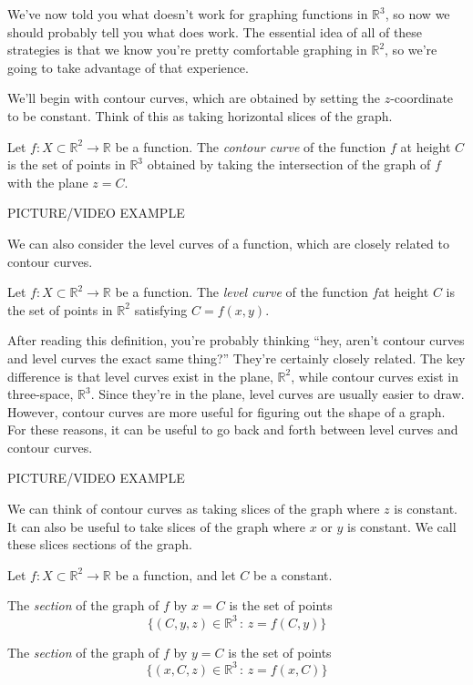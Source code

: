 \documentclass{ximera}
\begin{document}
We've now told you what doesn't work for graphing functions in $\mathbb{R}^3$, so now we should probably tell you what does work. The essential idea of all of these strategies is that we know you're pretty comfortable graphing in $\mathbb{R}^2$, so we're going to take advantage of that experience.

We'll begin with contour curves, which are obtained by setting the $z$-coordinate to be constant. Think of this as taking horizontal slices of the graph.

\begin{definition}
Let $f:X\subset\mathbb{R}^2\rightarrow\mathbb{R}$ be a function. The \emph{contour curve} of the function $f$ at height $C$ is the set of points in $\mathbb{R}^3$ obtained by taking the intersection of the graph of $f$ with the plane $z=C$.
\end{definition} 

PICTURE/VIDEO EXAMPLE

We can also consider the level curves of a function, which are closely related to contour curves.

\begin{definition}
Let $f:X\subset\mathbb{R}^2\rightarrow\mathbb{R}$ be a function. The \emph{level curve} of the function $f$at height $C$ is the set of points in $\mathbb{R}^2$ satisfying $C = f(x,y)$.
\end{definition}

After reading this definition, you're probably thinking ``hey, aren't contour curves and level curves the exact same thing?'' They're certainly closely related. The key difference is that level curves exist in the plane, $\mathbb{R}^2$, while contour curves exist in three-space, $\mathbb{R}^3$. Since they're in the plane, level curves are usually easier to draw. However, contour curves are more useful for figuring out the shape of a graph. For these reasons, it can be useful to go back and forth between level curves and contour curves.

PICTURE/VIDEO EXAMPLE

We can think of contour curves as taking slices of the graph where $z$ is constant. It can also be useful to take slices of the graph where $x$ or $y$ is constant. We call these slices sections of the graph.

\begin{definition}
Let $f:X\subset\mathbb{R}^2\rightarrow\mathbb{R}$ be a function, and let $C$ be a constant.

The \emph{section} of the graph of $f$ by $x=C$ is the set of points 
\[
\{(C,y,z)\in\mathbb{R}^3\,:\,z = f(C,y)\}
\]

The \emph{section} of the graph of $f$ by $y=C$ is the set of points 
\[
\{(x,C,z)\in\mathbb{R}^3\,:\,z = f(x,C)\}
\]
\end{definition}
\end{document}

